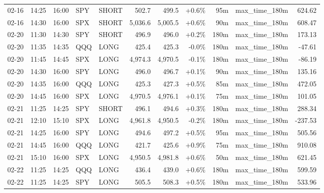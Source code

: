 \documentclass[11pt,a4paper,twoside]{article}
\begin{document}
\begin{center}
\begin{longtable}{>{\color{txtmain}}l l l l l r r r r >{\color{txtmain}}l r}
02-16 & 14:25 & 16:00 & SPY & SHORT & 502.7 & 499.5 & \textcolor{wingreen}{+0.6\%} & 95m & max\_time\_180m & \textcolor{wingreen}{624.62} \\
02-16 & 14:30 & 16:00 & SPX & SHORT & 5,036.6 & 5,005.5 & \textcolor{wingreen}{+0.6\%} & 90m & max\_time\_180m & \textcolor{wingreen}{608.47} \\
02-20 & 11:30 & 14:30 & SPY & SHORT & 496.9 & 496.0 & \textcolor{wingreen}{+0.2\%} & 180m & max\_time\_180m & \textcolor{wingreen}{173.13} \\
02-20 & 11:35 & 14:35 & QQQ & LONG & 425.4 & 425.3 & \textcolor{lossred}{-0.0\%} & 180m & max\_time\_180m & \textcolor{lossred}{-47.61} \\
02-20 & 11:45 & 14:45 & SPX & LONG & 4,974.3 & 4,970.5 & \textcolor{lossred}{-0.1\%} & 180m & max\_time\_180m & \textcolor{lossred}{-86.19} \\
02-20 & 14:30 & 16:00 & SPY & LONG & 496.0 & 496.7 & \textcolor{wingreen}{+0.1\%} & 90m & max\_time\_180m & \textcolor{wingreen}{135.16} \\
02-20 & 14:35 & 16:00 & QQQ & LONG & 425.3 & 427.3 & \textcolor{wingreen}{+0.5\%} & 85m & max\_time\_180m & \textcolor{wingreen}{472.05} \\
02-20 & 14:45 & 16:00 & SPX & LONG & 4,970.5 & 4,976.1 & \textcolor{wingreen}{+0.1\%} & 75m & max\_time\_180m & \textcolor{wingreen}{101.05} \\
02-21 & 11:25 & 14:25 & SPY & SHORT & 496.1 & 494.6 & \textcolor{wingreen}{+0.3\%} & 180m & max\_time\_180m & \textcolor{wingreen}{288.34} \\
02-21 & 12:10 & 15:10 & SPX & LONG & 4,961.8 & 4,950.5 & \textcolor{lossred}{-0.2\%} & 180m & max\_time\_180m & \textcolor{lossred}{-237.53} \\
02-21 & 14:25 & 16:00 & SPY & LONG & 494.6 & 497.2 & \textcolor{wingreen}{+0.5\%} & 95m & max\_time\_180m & \textcolor{wingreen}{505.56} \\
02-21 & 14:45 & 16:00 & QQQ & LONG & 421.7 & 425.6 & \textcolor{wingreen}{+0.9\%} & 75m & max\_time\_180m & \textcolor{wingreen}{910.08} \\
02-21 & 15:10 & 16:00 & SPX & LONG & 4,950.5 & 4,981.8 & \textcolor{wingreen}{+0.6\%} & 50m & max\_time\_180m & \textcolor{wingreen}{621.45} \\
02-22 & 11:25 & 14:25 & QQQ & LONG & 436.4 & 439.0 & \textcolor{wingreen}{+0.6\%} & 180m & max\_time\_180m & \textcolor{wingreen}{599.59} \\
02-22 & 11:25 & 14:25 & SPY & LONG & 505.5 & 508.3 & \textcolor{wingreen}{+0.5\%} & 180m & max\_time\_180m & \textcolor{wingreen}{533.96} \\

\end{longtable}
\end{center}
\end{document}
